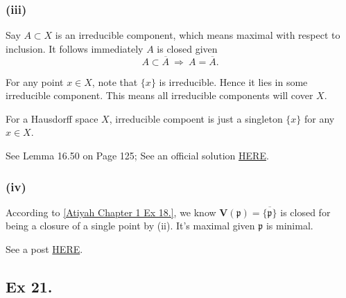 \subsubsection{(iii)}

Say $A\subset X$ is an irreducible component, which means maximal with respect to inclusion. It follows immediately $A$ is closed given $$A\subset \overline{A} ~\Rightarrow~ A=\overline{A}.$$

For any point $x\in X$, note that $\{x\}$ is irreducible. Hence it lies in some irreducible component. This means all irreducible components will cover $X$.

For a Hausdorff space $X$, irreducible compoent is just a singleton $\{x\}$ for any $x\in X$.

See \cite{altman} Lemma 16.50 on Page 125; See an official solution \href{https://metaphor.ethz.ch/x/2019/hs/401-3660-69L/ex/SolSheet1.pdf}{HERE}.

\subsubsection{(iv)}

According to \ref{Atiyah Chapter 1 Ex 18.}, we know $\mathbf V(\mathfrak p)=\overline{\{\mathfrak p\}}$ is closed for being a closure of a single point by (ii). It's maximal given $\mathfrak p$ is minimal.

See a post \href{https://math.stackexchange.com/questions/764677/irreducible-components-of-speca}{HERE}.

\subsection{Ex 21.}\label{Atiyah Chapter 1 Ex 21.}

